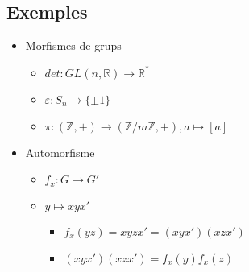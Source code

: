 \documentclass{article}
\newcommand{\Z}{\mathbb{Z}}
\newcommand{\R}{\mathbb{R}}
\begin{document}
\subsection{Exemples}
\begin{itemize}
\item Morfismes de grups
	\begin{itemize}
	\item $det: GL(n, \R) \to \R^*$
	\item $\varepsilon: S_n \to \{\pm 1\}$
	\item $\pi: (\Z, +) \to (\Z/m\Z, +), a \mapsto [a]$
	\end{itemize}
\item Automorfisme
	\begin{itemize}
	\item $f_x:G\to G'$
	\item $y \mapsto xyx'$
		\begin{itemize}
		\item $f_x(yz) = xyzx' = (xyx')(xzx')$
		\item $(xyx')(xzx') = f_x(y)f_x(z)$
		\end{itemize}
	\end{itemize}
\end{itemize}
\end{document}

